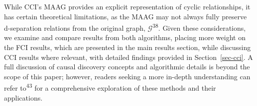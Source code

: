 \documentclass[
]{article}
\begin{document}
While CCI's MAAG provides an explicit representation of cyclic
relationships, it has certain theoretical limitations, as the MAAG may
not always fully preserve d-separation relations from the original
graph, \(\mathcal{G}\)\textsuperscript{38}. Given these considerations,
we examine and compare results from both algorithms, placing more weight
on the FCI results, which are presented in the main results section,
while discussing CCI results where relevant, with detailed findings
provided in Section~\ref{sec-cci}. A full discussion of causal discovery
concepts and algorithmic details is beyond the scope of this paper;
however, readers seeking a more in-depth understanding can refer
to\textsuperscript{43} for a comprehensive exploration of these methods
and their applications.

\begin{figure}

\begin{minipage}{0.33\linewidth}



\end{minipage}%
%
\begin{minipage}{0.33\linewidth}

\end{minipage}
\end{figure}
\end{document}
